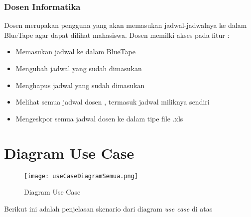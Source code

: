 \subsubsection{Dosen Informatika}
Dosen merupakan pengguna yang akan memasukan jadwal-jadwalnya ke dalam BlueTape agar dapat dilihat mahasiswa. Dosen memilki akses pada fitur :
\begin{itemize}
	\item Memasukan jadwal ke dalam BlueTape
	\item Mengubah jadwal yang sudah dimasukan  
	\item Menghapus jadwal yang sudah dimasukan
	\item Melihat semua jadwal dosen , termasuk jadwal miliknya sendiri
	\item Mengeskpor semua jadwal dosen ke dalam tipe file .xls
\end{itemize}

\section{Diagram Use Case}
\begin{figure} [H]
	\centering  
	\texttt{[image: useCaseDiagramSemua.png]}
	\caption[Diagram Use Case]{Diagram Use Case} 
	\label{fig:flow-chart-CodeIgniter} 
\end{figure}
Berikut ini adalah penjelasan skenario dari diagram \textit{use case} di atas

